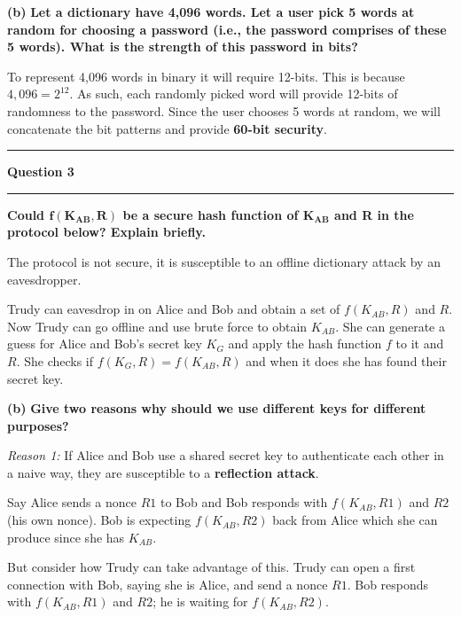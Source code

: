 \documentclass[11pt]{article}
\newcommand\question[2]{\vspace{.25in}\hrule\textbf{#1}\vspace{.5em}\hrule\vspace{.10in}}
\renewcommand\part[1]{\vspace{.10in}\textbf{(#1)}}
\begin{document}
\part{b} \textbf{Let a dictionary have 4,096 words. Let a user pick 5 words at random for choosing a password (i.e., the password comprises of these 5 words). What is the strength of this password in bits?}

To represent 4,096 words in binary it will require 12-bits. This is because $4,096 = 2^{12}$. As such, each randomly picked word will provide 12-bits of randomness to the password. Since the user chooses 5 words at random, we will concatenate the bit patterns and provide \textbf{60-bit security}.

\question{Question 3}

\part{a} \textbf{Could $\mathbf{f(K_{AB}, R)}$ be a secure hash function of $\mathbf{K_{AB}}$ and R in the protocol below? Explain briefly.}

The protocol is not secure, it is susceptible to an offline dictionary attack by an eavesdropper. 

Trudy can eavesdrop in on Alice and Bob and obtain a set of $f(K_{AB}, R)$ and $R$. Now Trudy can go offline and use brute force to obtain $K_{AB}$. She can generate a guess for Alice and Bob's secret key $K_{G}$ and apply the hash function $f$ to it and $R$. She checks if $f(K_{G}, R) = f(K_{AB}, R)$ and when it does she has found their secret key.

\part{b} \textbf{Give two reasons why should we use different keys for different purposes?}

\textit{Reason 1:} If Alice and Bob use a shared secret key to authenticate each other in a naive way, they are susceptible to a \textbf{reflection attack}. 

Say Alice sends a nonce $R1$ to Bob and Bob responds with $f(K_{AB}, R1)$ and $R2$ (his own nonce). Bob is expecting $f(K_{AB}, R2)$ back from Alice which she can produce since she has $K_{AB}$.

But consider how Trudy can take advantage of this. Trudy can open a first connection with Bob, saying she is Alice, and send a nonce $R1$. Bob responds with $f(K_{AB}, R1)$ and $R2$; he is waiting for $f(K_{AB}, R2)$. 
\end{document}
